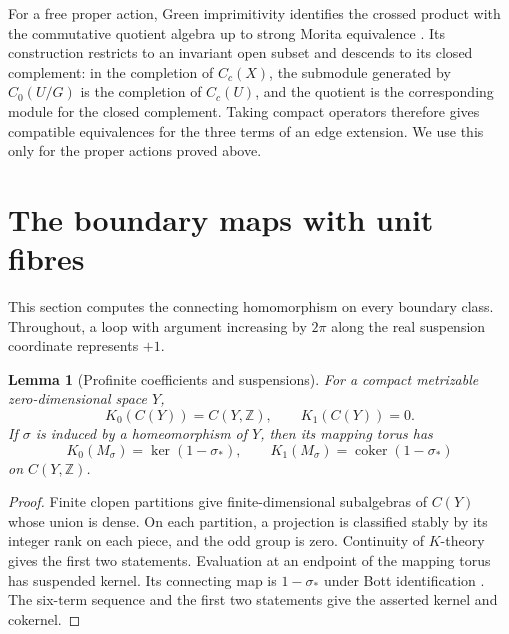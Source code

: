 \documentclass[11pt]{article}
\newcommand{\Z}{\mathbb Z}
\newcommand{\coker}{\operatorname{coker}}
\newtheorem{lemma}[theorem]{Lemma}
\theoremstyle{definition}
\theoremstyle{remark}
\begin{document}
For a free proper action, Green imprimitivity identifies the crossed product with the commutative quotient algebra up to strong Morita equivalence \citep[Theorem 14 and Corollary 15, pp.~88--91]{Green}. Its construction restricts to an invariant open subset and descends to its closed complement: in the completion of $C_c(X)$, the submodule generated by $C_0(U/G)$ is the completion of $C_c(U)$, and the quotient is the corresponding module for the closed complement. Taking compact operators therefore gives compatible equivalences for the three terms of an edge extension. We use this only for the proper actions proved above.

\section{The boundary maps with unit fibres}

This section computes the connecting homomorphism on every boundary class. Throughout, a loop with argument increasing by $2\pi$ along the real suspension coordinate represents $+1$.

\begin{lemma}[Profinite coefficients and suspensions]\label{lem:profinite}
For a compact metrizable zero-dimensional space $Y$,
\[
 K_0(C(Y))=C(Y,\Z),\qquad K_1(C(Y))=0.
\]
If $\sigma$ is induced by a homeomorphism of $Y$, then its mapping torus has
\[
 K_0(M_\sigma)=\ker(1-\sigma_*),\qquad
 K_1(M_\sigma)=\coker(1-\sigma_*)
\]
on $C(Y,\Z)$.
\end{lemma}
\begin{proof}
Finite clopen partitions give finite-dimensional subalgebras of $C(Y)$ whose union is dense. On each partition, a projection is classified stably by its integer rank on each piece, and the odd group is zero. Continuity of $K$-theory gives the first two statements. Evaluation at an endpoint of the mapping torus has suspended kernel. Its connecting map is $1-\sigma_*$ under Bott identification \citep[Proposition 10.4.1, p.~76]{Blackadar}. The six-term sequence and the first two statements give the asserted kernel and cokernel.
\end{proof}
\end{document}
